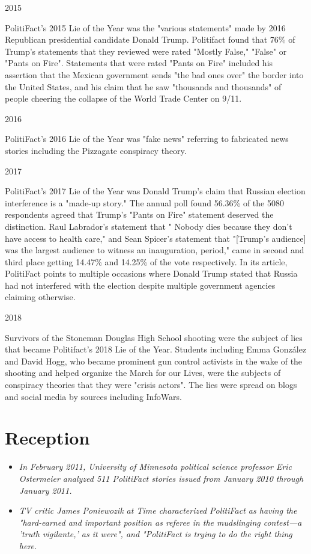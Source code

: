 2015

PolitiFact's 2015 Lie of the Year was the "various statements" made by
2016 Republican presidential candidate Donald Trump. Politifact found
that 76\% of Trump's statements that they reviewed were rated "Mostly
False," "False" or "Pants on Fire". Statements that were rated "Pants on
Fire" included his assertion that the Mexican government sends "the bad
ones over" the border into the United States, and his claim that he saw
"thousands and thousands" of people cheering the collapse of the World
Trade Center on 9/11.

2016

PolitiFact's 2016 Lie of the Year was "fake news" referring to
fabricated news stories including the Pizzagate conspiracy theory.

2017

PolitiFact's 2017 Lie of the Year was Donald Trump's claim that Russian
election interference is a "made-up story." The annual poll found
56.36\% of the 5080 respondents agreed that Trump's "Pants on Fire"
statement deserved the distinction. Raul Labrador's statement that "
Nobody dies because they don't have access to health care," and Sean
Spicer's statement that "{[}Trump's audience{]} was the largest audience
to witness an inauguration, period," came in second and third place
getting 14.47\% and 14.25\% of the vote respectively. In its article,
PolitiFact points to multiple occasions where Donald Trump stated that
Russia had not interfered with the election despite multiple government
agencies claiming otherwise.

2018

Survivors of the Stoneman Douglas High School shooting were the subject
of lies that became Politifact's 2018 Lie of the Year. Students
including Emma González and David Hogg, who became prominent gun control
activists in the wake of the shooting and helped organize the March for
our Lives, were the subjects of conspiracy theories that they were
"crisis actors". The lies were spread on blogs and social media by
sources including InfoWars.

\section{Reception}\label{reception}

\begin{itemize}
\item
  \emph{In February 2011, University of Minnesota political science
  professor Eric Ostermeier analyzed 511 PolitiFact stories issued from
  January 2010 through January 2011.}
\item
  \emph{TV critic James Poniewozik at Time characterized PolitiFact as
  having the "hard-earned and important position as referee in the
  mudslinging contest---a 'truth vigilante,' as it were", and
  "PolitiFact is trying to do the right thing here.}
\end{itemize}


